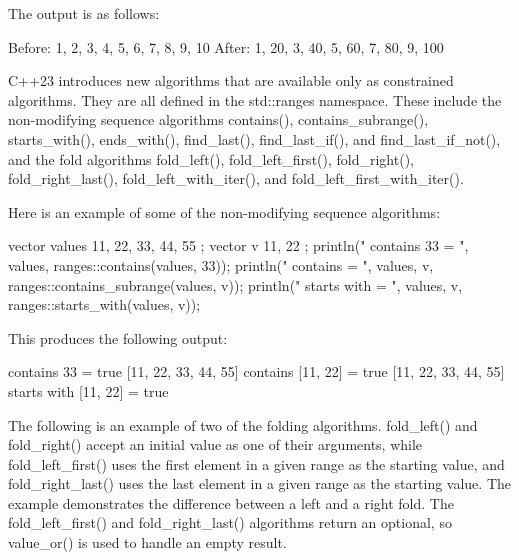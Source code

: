 
The output is as follows:

\begin{shell}
Before: 1, 2, 3, 4, 5, 6, 7, 8, 9, 10
After: 1, 20, 3, 40, 5, 60, 7, 80, 9, 100
\end{shell}



C++23 introduces new algorithms that are available only as constrained algorithms. They are all defined in the std::ranges namespace. These include the non-modifying sequence algorithms contains(), contains\_subrange(), starts\_with(), ends\_with(), find\_last(), find\_last\_if(), and find\_last\_if\_not(), and the fold algorithms fold\_left(), fold\_left\_first(), fold\_right(), fold\_right\_last(), fold\_left\_with\_iter(), and fold\_left\_first\_with\_iter().

Here is an example of some of the non-modifying sequence algorithms:

\begin{cpp}
vector values { 11, 22, 33, 44, 55 };
vector v { 11, 22 };
println("{} contains 33 = {}", values, ranges::contains(values, 33));
println("{} contains {} = {}", values, v, ranges::contains_subrange(values, v));
println("{} starts with {} = {}", values, v, ranges::starts_with(values, v));
\end{cpp}

This produces the following output:

\begin{shell}
[11, 22, 33, 44, 55] contains 33 = true
[11, 22, 33, 44, 55] contains [11, 22] = true
[11, 22, 33, 44, 55] starts with [11, 22] = true
\end{shell}

The following is an example of two of the folding algorithms. fold\_left() and fold\_right() accept an initial value as one of their arguments, while fold\_left\_first() uses the first element in a given range as the starting value, and fold\_right\_last() uses the last element in a given range as the starting value. The example demonstrates the difference between a left and a right fold. The fold\_left\_first() and fold\_right\_last() algorithms return an optional, so value\_or() is used to handle an empty result.

